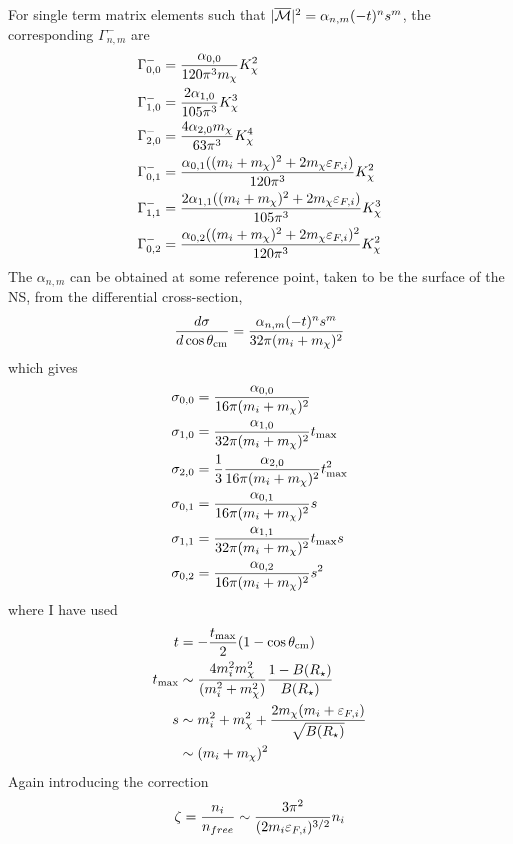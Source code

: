 For single term matrix elements such that $|\overline{\mathcal M}|^2 = \alpha_{n,m}(-t)^n s^m$, the corresponding $\Gamma_{n,m}^-$ are
\begin{align}
    \Gamma^-_{0,0} & = \frac{\alpha_{0,0}}{120\pi^3 m_\chi}K_\chi^2\\
    \Gamma^-_{1,0} & = \frac{2\alpha_{1,0}}{105\pi^3}K_\chi^3\\
    \Gamma^-_{2,0} & = \frac{4\alpha_{2,0}m_\chi}{63\pi^3}K_\chi^4\\
    \Gamma^-_{0,1} & = \frac{\alpha_{0,1}((m_i + m_\chi)^2 + 2m_\chi \varepsilon_{F,i})}{120\pi^3}K_\chi^2\\
    \Gamma^-_{1,1} & = \frac{2\alpha_{1,1}((m_i + m_\chi)^2 + 2m_\chi \varepsilon_{F,i})}{105\pi^3}K_\chi^3\\
    \Gamma^-_{0,2} & = \frac{\alpha_{0,2}((m_i + m_\chi)^2 + 2m_\chi \varepsilon_{F,i})^2}{120\pi^3}K_\chi^2
\end{align}
The $\alpha_{n,m}$ can be obtained at some reference point, taken to be the surface of the NS, from the differential cross-section,
\begin{equation}
    \frac{d \sigma }{d\cos\theta_\mathrm{cm}} = \frac{\alpha_{n,m}(-t)^n s^m}{32 \pi (m_i + m_\chi)^2}
\end{equation}
which gives
\begin{align}
    \sigma_{0,0} & = \frac{\alpha_{0,0}}{16 \pi (m_i + m_\chi)^2}\\
    \sigma_{1,0} & = \frac{\alpha_{1,0} }{32 \pi (m_i + m_\chi)^2}t_\mathrm{max}\\
    \sigma_{2,0} & = \frac{1}{3}\frac{\alpha_{2,0} }{16 \pi (m_i + m_\chi)^2}t_\mathrm{max}^2\\
    \sigma_{0,1} & = \frac{\alpha_{0,1}}{16 \pi (m_i + m_\chi)^2}s\\
    \sigma_{1,1} & = \frac{\alpha_{1,1} }{32 \pi (m_i + m_\chi)^2}t_\mathrm{max}s\\
    \sigma_{0,2} & = \frac{\alpha_{0,2}}{16 \pi (m_i + m_\chi)^2}s^2
\end{align}
where I have used 
\begin{align}
    t & = -\frac{t_\mathrm{max}}{2}(1 - \cos\theta_\mathrm{cm})\\
    t_\mathrm{max} & \sim \frac{4 m_i^2 m_\chi^2}{(m_i^2 + m_\chi^2)}\frac{1 - B(R_\star)}{B(R_\star)}\\
    s & \sim m_i^2 + m_\chi^2 + \frac{2m_\chi (m_i +\varepsilon_{F,i})}{\sqrt{B(R_\star)}}\\
    &\sim (m_i +m_\chi)^2
\end{align}
Again introducing the correction 
\begin{equation}
    \zeta = \frac{n_i}{n_{free}} \sim \frac{3\pi^2}{(2m_i \varepsilon_{F,i})^{3/2}}n_i
\end{equation}

